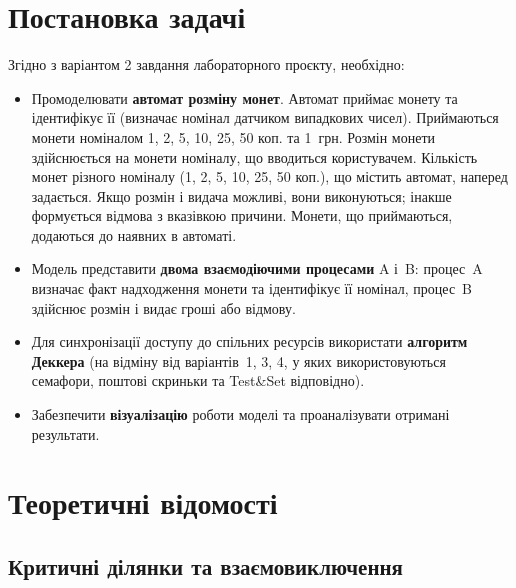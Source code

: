 \documentclass[a4paper,12pt]{article}
\begin{document}
\vspace{0.6cm}

\tableofcontents
\newpage

\section{Постановка задачі}

Згідно з варіантом 2 завдання лабораторного проєкту, необхідно:

\begin{itemize}
    \item Промоделювати \textbf{автомат розміну монет}. Автомат приймає
    монету та ідентифікує її (визначає номінал датчиком випадкових чисел).
    Приймаються монети номіналом 1, 2, 5, 10, 25, 50 коп. та 1~грн.
    Розмін монети здійснюється на монети номіналу, що вводиться
    користувачем. Кількість монет різного номіналу
    (1, 2, 5, 10, 25, 50 коп.), що містить автомат, наперед задається.
    Якщо розмін і видача можливі, вони виконуються; інакше формується
    відмова з вказівкою причини. Монети, що приймаються, додаються до
    наявних в автоматі.
    \item Модель представити \textbf{двома взаємодіючими процесами}
    A і~B: процес~A визначає факт надходження монети та ідентифікує її
    номінал, процес~B здійснює розмін і видає гроші або відмову.
    \item Для синхронізації доступу до спільних ресурсів використати
    \textbf{алгоритм Деккера} (на відміну від варіантів~1, 3, 4, у яких
    використовуються семафори, поштові скриньки та Test\&Set
    відповідно).
    \item Забезпечити \textbf{візуалізацію} роботи моделі та
    проаналізувати отримані результати.
\end{itemize}

\section{Теоретичні відомості}

\subsection{Критичні ділянки та взаємовиключення}
\end{document}
